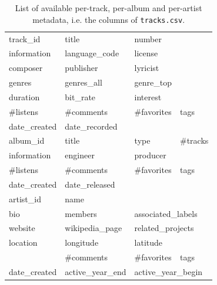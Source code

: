 \documentclass{article}
\begin{document}
\begin{table}
	\centering
	\begin{tabular}{|llll|}
		\hline
		track\_id & title & number & \\
		information & language\_code & license & \\
		composer & publisher & lyricist & \\
		genres & genres\_all & genre\_top & \\
		duration & bit\_rate & interest & \\ %
		\#listens & \#comments & \#favorites & tags \\
		date\_created & date\_recorded & & \\
		\hline
		album\_id & title & type & \#tracks \\
		information & engineer & producer & \\
		\#listens & \#comments & \#favorites & tags \\
		date\_created & date\_released & & \\
		\hline
		artist\_id & name & & \\
		bio & members & \multicolumn{2}{l|}{associated\_labels} \\
		website & wikipedia\_page & \multicolumn{2}{l|}{related\_projects} \\
		location & longitude & latitude & \\
		& \#comments & \#favorites & tags \\
		date\_created & active\_year\_end & \multicolumn{2}{l|}{active\_year\_begin} \\
		\hline
	\end{tabular}
	\caption{List of available per-track, per-album and per-artist metadata, i.e. the columns of \texttt{tracks.csv}.}
	\label{tab:metadata}
\end{table}

\end{document}
